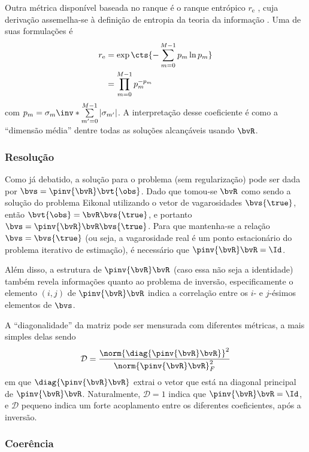 Outra métrica disponível baseada no ranque é o ranque entrópico $r_\text{e}$ \cite{roy_effective_2007}, cuja derivação assemelha-se à definição de entropia da teoria da informação \cite{gray_entropy_2011}. Uma de suas formulações é
\begin{equation}
	\begin{split}
		r_\text{e}
		& = \exp\cts{-\sum_{m=0}^{M-1} p_m \ln p_m} \\
		& = \prod_{m=0}^{M-1} p_m^{-p_m}
	\end{split}
\end{equation}
com $p_m = \sigma_m \inv*{\sum\limits_{m'=0}^{M-1} |\sigma_{m'}|}$. A interpretação desse coeficiente é como a ``dimensão média'' dentre todas as soluções alcançáveis usando $\bvR$.

\subsubsection*{Resolução}

Como já debatido, a solução para o problema (sem regularização) pode ser dada por $\bvs = \pinv{\bvR} \bvt{\obs}$. Dado que tomou-se $\bvR$ como sendo a solução do problema Eikonal utilizando o vetor de vagarosidades $\bvs{\true}$, então $\bvt{\obs} = \bvR \bvs{\true}$, e portanto $\bvs = \pinv{\bvR} \bvR \bvs{\true}$. Para que mantenha-se a relação $\bvs = \bvs{\true}$ (ou seja, a vagarosidade real é um ponto estacionário do problema iterativo de estimação), é necessário que $\pinv{\bvR} \bvR = \Id$.

Além disso, a estrutura de $\pinv{\bvR} \bvR$ (caso essa não seja a identidade) também revela informações quanto ao problema de inversão, especificamente o elemento $(i,j)$ de $\pinv{\bvR} \bvR$ indica a correlação entre os $i$- e $j$-ésimos elementos de $\bvs$.

A ``diagonalidade'' da matriz pode ser mensurada com diferentes métricas, a mais simples delas sendo
\begin{equation}
	\mathcal{D} = \frac{\norm{\diag{\pinv{\bvR} \bvR}}^2}{\norm{\pinv{\bvR} \bvR}_F^2}
\end{equation}
em que $\diag{\pinv{\bvR} \bvR}$ extrai o vetor que está na diagonal principal de $\pinv{\bvR} \bvR$. Naturalmente, $\mathcal{D} = 1$ indica que $\pinv{\bvR} \bvR = \Id$, e $\mathcal{D}$ pequeno indica um forte acoplamento entre os diferentes coeficientes, após a inversão.

\subsubsection*{Coerência}

